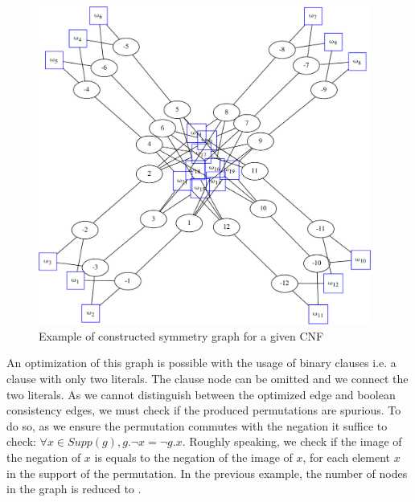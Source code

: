 \begin{figure}[h]
	\begin{minipage}[c]{.2\textwidth}
		
	\end{minipage}
	\begin{minipage}[l]{.75\textwidth}
		\includegraphics[width=4.3in]{cnfs/graph_cnf_no_opt-crop}
	\end{minipage}
\caption{Example of constructed symmetry graph for a given CNF}
\end{figure}




An optimization of this graph is possible with the usage of binary clauses i.e. a clause with only two literals.
The clause node can be omitted and we connect the two literals. As we cannot distinguish between the optimized edge 
and boolean consistency edges, we must check if the produced permutations are spurious. 
To do so, as we ensure the permutation commutes with the negation it suffice to check:
$\forall x \in Supp(g), g.\neg x = \neg g.x$.
Roughly speaking, we check if the image of the negation of $x$ is equals to the negation of the image of $x$,
for each element $x$ in the support of the permutation.
In the previous example, the number of nodes in the graph is reduced to .

